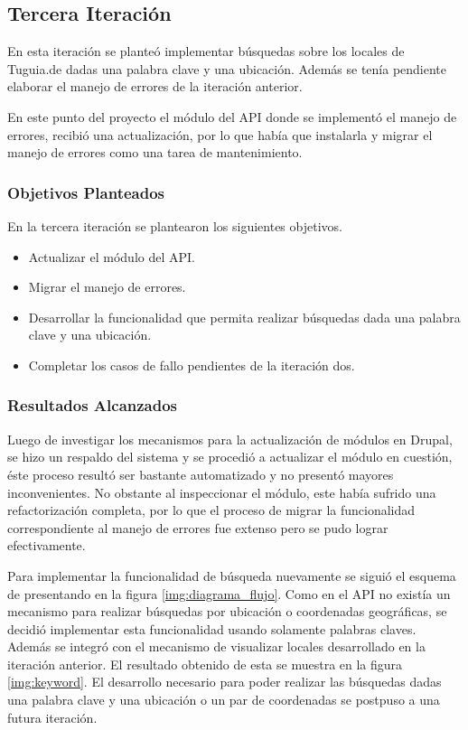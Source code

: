 \subsection{Tercera Iteración}

En esta iteración se planteó implementar búsquedas sobre los locales de Tuguia.de dadas una palabra clave y una ubicación. Además se tenía pendiente elaborar el manejo de errores de la iteración anterior.

En este punto del proyecto el módulo del API donde se implementó el manejo de errores, recibió una actualización, por lo que había que instalarla y migrar el manejo de errores como una tarea de mantenimiento.

\subsubsection{Objetivos Planteados} 
En la tercera iteración se plantearon los siguientes objetivos.
\begin{itemize}
\item Actualizar el módulo del API.
\item Migrar el manejo de errores.
\item Desarrollar la funcionalidad que permita realizar búsquedas dada una palabra clave y una ubicación.
\item Completar los casos de fallo pendientes de la iteración dos.
\end{itemize}

\subsubsection{Resultados Alcanzados}

Luego de investigar los mecanismos para la actualización de módulos en Drupal, se hizo un respaldo del sistema y se procedió a actualizar el módulo en cuestión, éste proceso resultó ser bastante automatizado y no presentó mayores inconvenientes. No obstante al inspeccionar el módulo, este había sufrido una refactorización completa, por lo que el proceso de migrar la funcionalidad correspondiente al manejo de errores fue extenso pero se pudo lograr efectivamente.

Para implementar la funcionalidad de búsqueda nuevamente se siguió el esquema de presentando en la figura \ref{img:diagrama_flujo}. Como en el API no existía un mecanismo para realizar búsquedas por  ubicación o coordenadas geográficas, se decidió implementar esta funcionalidad usando solamente palabras claves. Además se integró con el mecanismo de visualizar locales desarrollado en la iteración anterior. El resultado obtenido de esta se muestra en la figura \ref{img:keyword}. El desarrollo necesario para poder realizar las búsquedas dadas una palabra clave y una ubicación o un par de coordenadas se postpuso a una futura iteración.

